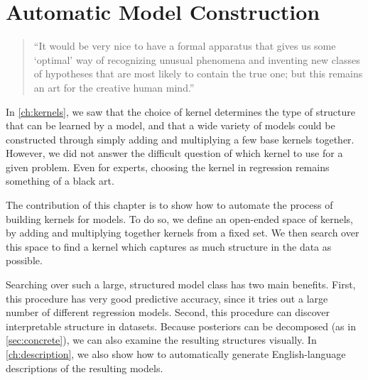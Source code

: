 
\inbpdocument


\chapter{Automatic Model Construction}
\label{ch:grammar}

\begin{quotation}
``It would be very nice to have a formal apparatus that gives us some `optimal' way of recognizing unusual phenomena and inventing new classes of hypotheses that are most likely to contain the true one; but this remains an art for the creative human mind.''

\hspace*{\fill}
\end{quotation}


In \cref{ch:kernels}, we saw that the choice of kernel determines the type of structure that can be learned by a \gp{} model, and that a wide variety of models could be constructed through simply adding and multiplying a few base kernels together.
However, we did not answer the difficult question of which kernel to use for a given problem.
Even for experts, choosing the kernel in \gp{} regression remains something of a black art.

The contribution of this chapter is to show how to automate the process of building kernels for \gp{} models.
To do so, we define an open-ended space of kernels, by adding and multiplying together kernels from a fixed set.
We then search over this space to find a kernel which captures as much structure in the data as possible.

Searching over such a large, structured model class has two main benefits.
First, this procedure has very good predictive accuracy, since it tries out a large number of different regression models.
Second, this procedure can discover interpretable structure in datasets.
Because \gp{} posteriors can be decomposed (as in \cref{sec:concrete}), we can also examine the resulting structures visually.
In \cref{ch:description}, we also show how to automatically generate English-language descriptions of the resulting models.

